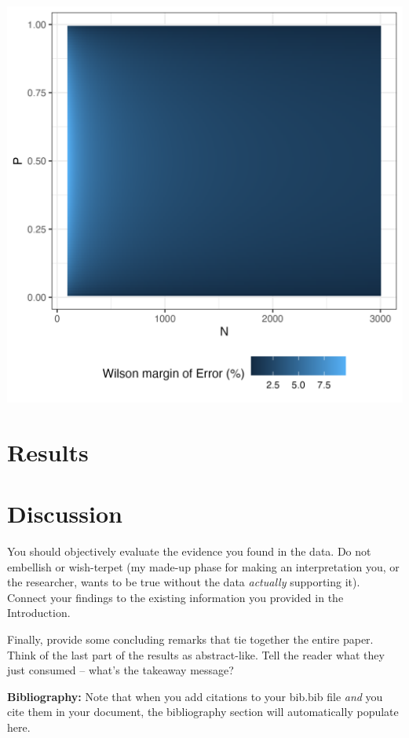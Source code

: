 \documentclass{article}\usepackage[]{graphicx}\usepackage[]{xcolor}
\newenvironment{Figure}
  {\par\medskip\noindent\minipage{\linewidth}}
  {\endminipage\par\medskip}
\begin{document}
\begin{multicols}{2}
\begin{Figure}
 \centering
 \includegraphics[width =0.7\linewidth]{error.wilson.png}
 \label{fig:errw}
\end{Figure}


\section{Results}



\section{Discussion}
 You should objectively evaluate the evidence you found in the data. Do not embellish or wish-terpet (my made-up phase for making an interpretation you, or the researcher, wants to be true without the data \emph{actually} supporting it). Connect your findings to the existing information you provided in the Introduction.

Finally, provide some concluding remarks that tie together the entire paper. Think of the last part of the results as abstract-like. Tell the reader what they just consumed -- what's the takeaway message?

\vspace{2em}

\noindent\textbf{Bibliography:} Note that when you add citations to your bib.bib file \emph{and}
you cite them in your document, the bibliography section will automatically populate here.

\begin{tiny}

\end{tiny}
\end{multicols}
\end{document}
